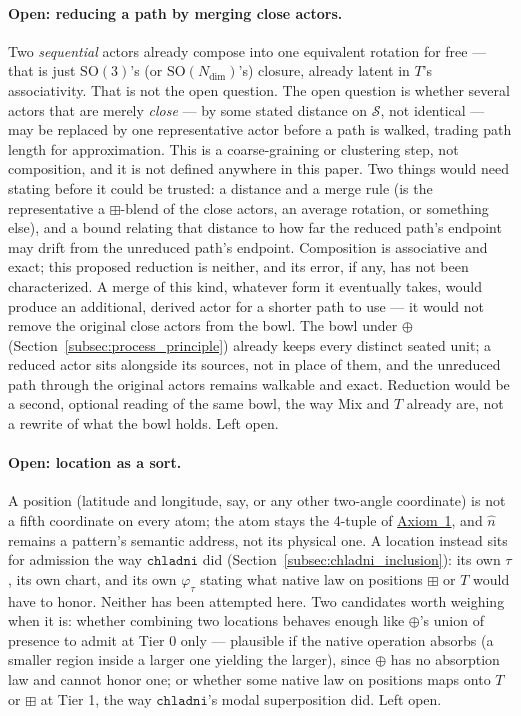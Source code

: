 \documentclass[12pt, a4paper]{article}
\begin{document}
\paragraph{Open: reducing a path by merging close actors.} Two
\emph{sequential} actors already compose into one equivalent rotation
for free --- that is just $\mathrm{SO}(3)$'s (or $\mathrm{SO}(N_{\mathrm{dim}})$'s)
closure, already latent in $T$'s associativity. That is not the open
question. The open question is whether several actors that are
merely \emph{close} --- by some stated distance on $\mathcal{S}$, not
identical --- may be replaced by one representative actor before a
path is walked, trading path length for approximation. This is a
coarse-graining or clustering step, not composition, and it is not
defined anywhere in this paper. Two things would need stating before
it could be trusted: a distance and a merge rule (is the
representative a $\boxplus$-blend of the close actors, an average
rotation, or something else), and a bound relating that distance to
how far the reduced path's endpoint may drift from the unreduced
path's endpoint. Composition is associative and exact;
this proposed reduction is neither, and its error, if any, has not
been characterized.
A merge of this kind, whatever form it eventually takes, would
produce an additional, derived actor for a shorter path to use --- it
would not remove the original close actors from the bowl. The bowl
under $\oplus$ (Section~\ref{subsec:process_principle}) already keeps
every distinct seated unit; a reduced actor sits alongside its
sources, not in place of them, and the unreduced path through the
original actors remains walkable and exact. Reduction would be a
second, optional reading of the same bowl, the way Mix and $T$
already are, not a rewrite of what the bowl holds. Left open.

\paragraph{Open: location as a sort.} A position (latitude and
longitude, say, or any other two-angle coordinate) is not a fifth
coordinate on every atom; the atom stays the 4-tuple of
\hyperref[subsec:axiom1]{Axiom~1}, and $\hat n$ remains a pattern's semantic
address, not its physical one. A location instead sits for admission
the way $\mathtt{chladni}$ did
(Section~\ref{subsec:chladni_inclusion}): its own $\tau$, its own
chart, and its own $\varphi_\tau$ stating what native law on positions
$\boxplus$ or $T$ would have to honor. Neither has been attempted
here. Two candidates worth weighing when it is: whether combining two
locations behaves enough like $\oplus$'s union of presence to admit at
Tier 0 only --- plausible if the native operation absorbs (a smaller
region inside a larger one yielding the larger), since $\oplus$ has no
absorption law and cannot honor one; or whether some native law on
positions maps onto $T$ or $\boxplus$ at Tier 1, the way
$\mathtt{chladni}$'s modal superposition did. Left open.
\end{document}
